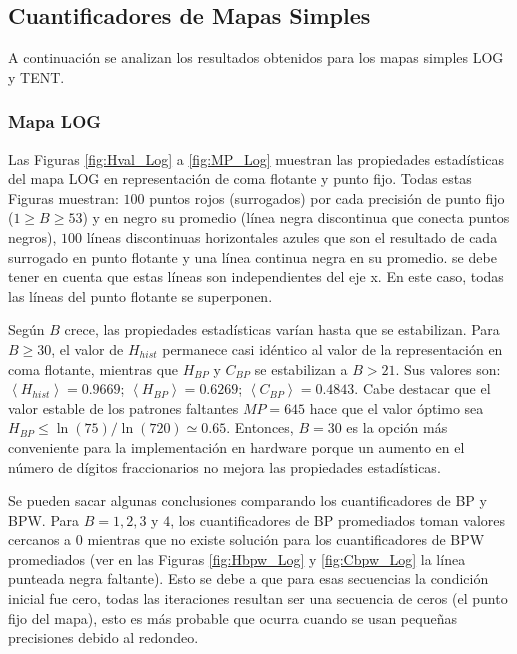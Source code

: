 \subsection {Cuantificadores de Mapas Simples}
\label{subsec:SimpleMaps}

A continuación se analizan los resultados obtenidos para los mapas simples LOG y TENT.

\subsubsection{Mapa LOG}
\label{subsubsec:log}

Las Figuras \ref{fig:Hval_Log} a \ref{fig:MP_Log} muestran las propiedades estadísticas del mapa LOG en representación de coma flotante y punto fijo.
Todas estas Figuras muestran: $100$ puntos rojos (surrogados) por cada precisión de punto fijo ($1 \geq B \geq 53$) y en negro su promedio (línea negra discontinua que conecta puntos negros), $100$ líneas discontinuas horizontales azules que son el resultado de cada surrogado en punto flotante y una línea continua negra en su promedio.
se debe tener en cuenta que estas líneas son independientes del eje x.
En este caso, todas las líneas del punto flotante se superponen.

Según $B$ crece, las propiedades estadísticas varían hasta que se estabilizan.
Para $B \geq 30$, el valor de $H_{hist}$ permanece casi idéntico al valor de la representación en coma flotante, mientras que $H_{BP}$ y $C_{BP}$ se estabilizan a $B > 21$.
Sus valores son: $\left\langle H_{hist}\right\rangle = 0.9669$; $\left\langle H_{BP}\right\rangle = 0.6269$; $\left\langle C_{BP}\right\rangle = 0.4843$.
Cabe destacar que el valor estable de los patrones faltantes $MP = 645$ hace que el valor óptimo sea $H_{BP} \leq \ln(75)/\ln(720) \simeq 0.65$.
Entonces, $B = 30$ es la opción más conveniente para la implementación en hardware porque un aumento en el número de dígitos fraccionarios no mejora las propiedades estadísticas.

Se pueden sacar algunas conclusiones comparando los cuantificadores de BP y BPW.
Para $B = 1, 2, 3$ y $4$, los cuantificadores de BP promediados toman valores cercanos a $0$ mientras que no existe solución para los cuantificadores de BPW promediados (ver en las Figuras \ref{fig:Hbpw_Log} y \ref{fig:Cbpw_Log} la línea punteada negra faltante).
Esto se debe a que para esas secuencias la condición inicial fue cero, todas las iteraciones resultan ser una secuencia de ceros (el punto fijo del mapa), esto es más probable que ocurra cuando se usan pequeñas precisiones debido al redondeo.

